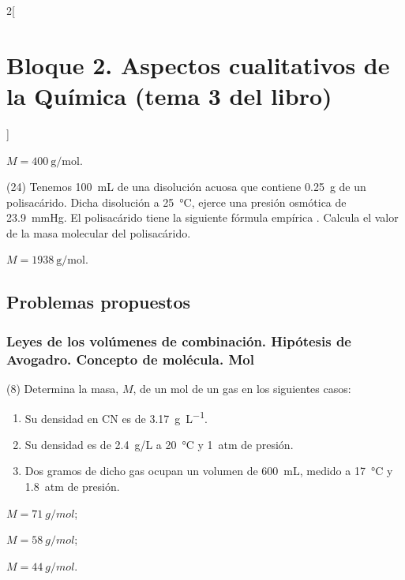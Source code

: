 \documentclass[10pt]{article}
\begin{document}
\begin{multicols}{2}[
    \section{Bloque 2. Aspectos cualitativos de la Química (tema 3 del libro)}
  ]
\begin{solution}
  \( M = \SI{400}{\gram\per\mole} \).
\end{solution}




\begin{exercise}[
    tags    = {},
    topics  = {química,química básica},
    source  = {FQ 1B MGH 2016, p80, e24},
  ]
  (24) Tenemos \SI{100}{\milli\liter} de una disolución acuosa que contiene \SI{0.25}{\gram} de un polisacárido. Dicha disolución a \SI{25}{\celsius}, ejerce una presión osmótica de \SI{23.9}{\mmHg}. El polisacárido tiene la siguiente fórmula empírica . Calcula el valor de la masa molecular del polisacárido.
\end{exercise}

\begin{solution}
  \( M = \SI{1938}{\gram\per\mole} \).
\end{solution}







\subsection{Problemas propuestos}

\subsubsection{Leyes de los volúmenes de combinación. Hipótesis de Avogadro. Concepto de molécula. Mol}

\begin{exercise}[
    tags    = {},
    topics  = {química,química básica},
    source  = {FQ 1B MGH 2016, p83, e8},
  ]
  (8) Determina la masa, \( M \), de un mol de un gas en los siguientes
  casos:
  \begin{enumerate}
    \item Su densidad en CN es de \SI{3.17}{\gram\per\liter}.
    \item Su densidad es de \SI{2.4}{g/L} a \SI{20}{\celsius} y \SI{1}{atm} de presión.
    \item Dos gramos de dicho gas ocupan un volumen de \SI{600}{\milli\liter}, medido a \SI{17}{\celsius} y \SI{1.8}{atm} de presión.
  \end{enumerate}
\end{exercise}

\begin{solution}
  \begin{enumerate*}
    \item \( M = \SI{71}{g/mol} \);
    \item \( M = \SI{58}{g/mol} \);
    \item \( M = \SI{44}{g/mol} \).
    \end{enumerate*}
\end{solution}





\end{multicols}
\end{document}
